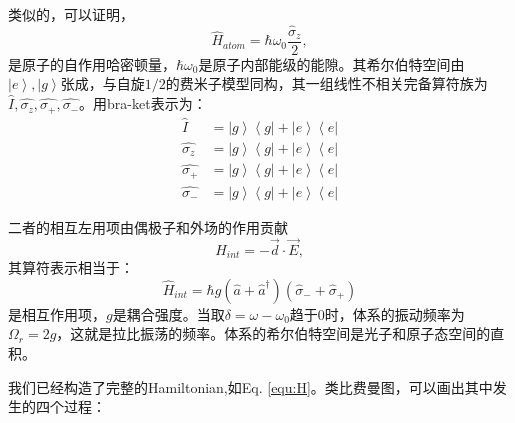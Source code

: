 \documentclass{ctexart}
\begin{document}
类似的，可以证明，
\begin{equation}
    \hat{H}_{atom} = \hbar \omega_{0} \frac{\hat{\sigma}_{z}}{2},
\end{equation}
是原子的自作用哈密顿量，$\hbar\omega_0$是原子内部能级的能隙。其希尔伯特空间由$\left|e\right>,\left|g\right>$张成，与自旋$1/2$的费米子模型同构，其一组线性不相关完备算符族为$\hat{I},\hat{\sigma_z},\hat{\sigma_+},\hat{\sigma_-}$。用bra-ket表示为：
\begin{equation}
    \begin{aligned}
        \hat{I}        & = \left|g\right>\left<g\right|+\left|e\right>\left<e\right| \\
        \hat{\sigma_z} & = \left|g\right>\left<g\right|+\left|e\right>\left<e\right| \\
        \hat{\sigma_+} & = \left|g\right>\left<g\right|+\left|e\right>\left<e\right| \\
        \hat{\sigma_-} & = \left|g\right>\left<g\right|+\left|e\right>\left<e\right|
    \end{aligned}
    \label{equ:sigmas}
\end{equation}

二者的相互左用项由偶极子和外场的作用贡献
\begin{equation*}
    H_{int} = -\vec{d}\cdot\vec{E},
\end{equation*}
其算符表示相当于：
\begin{equation}
    \hat{H}_{int} = \hbar g\left(\hat{a} +\hat{a}^{\dagger} \right)\left(\hat{\sigma}_{-}+\hat{\sigma}_{+}\right)
\end{equation}
是相互作用项，$g$是耦合强度。当取$\delta  = \omega-\omega_0$趋于0时，体系的振动频率为$\Omega_r = 2g$，这就是拉比振荡的频率。体系的希尔伯特空间是光子和原子态空间的直积。

我们已经构造了完整的Hamiltonian,如Eq. \ref{equ:H}。类比费曼图，可以画出其中发生的四个过程：
\end{document}

